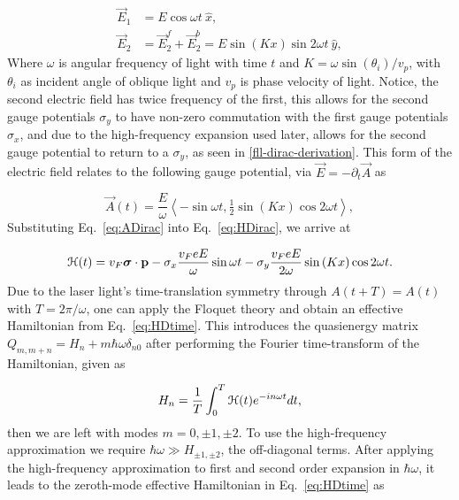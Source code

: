 \begin{align} \label{eq:EDfield}
\vec{E}_{1} &= E\cos \omega t\ \hat{x}, \nonumber \\
\vec{E}_{2} &= \vec{E}_2^f + \vec{E}_2^b = E\sin(Kx)\sin 2\omega t\ \hat{y},
\end{align}
Where $\omega$ is angular frequency of light with time $t$ and $K = \omega \sin{(\theta_i)} / v_p$, with $\theta_i$ as incident angle of oblique light and $v_p$ is phase velocity of light.
Notice, the second electric field has twice frequency of the first, this allows for the second gauge potentials $\sigma_y$ to have non-zero commutation with the first gauge potentials $\sigma_x$, and due to the high-frequency expansion used later, allows for the second gauge potential to return to a $\sigma_y$, as seen in \ref{fll-dirac-derivation}.
This form of the electric field relates to the following gauge potential, via $\vec{E} = -\partial_t \vec{A}$ as

\begin{equation}\label{eq:ADirac}
  \vec{A}(t)= \dfrac{E}{\omega} \left\langle -\sin \omega t, \tfrac{1}{2}\sin(Kx) \cos 2\omega t \right\rangle,
\end{equation}%
Substituting Eq.~\eqref{eq:ADirac} into Eq.~\eqref{eq:HDirac}, we arrive at%

\begin{equation}\label{eq:HDtime}
  \mathcal{H}(t)= v_{F}\bm{\sigma}\cdot\mathbf{p} - \sigma _{x} \dfrac{v_F eE}{\omega} \sin {\omega t} - \sigma _{y} \dfrac{v_F eE}{2\omega}\sin{(Kx)} \cos2\omega t.
\end{equation}%
Due to the laser light's time-translation symmetry through $A(t+T)=A(t)$ with $T=2\pi /\omega $, one can apply the Floquet theory \cite{AEE, MBL, supp} and obtain an effective Hamiltonian from Eq.~\eqref{eq:HDtime}.
This introduces the quasienergy matrix $Q_{m,m+n} = H_n + m\hbar\omega\delta_{n0}$ after performing the Fourier time-transform of the Hamiltonian, given as

\begin{equation} \label{eq:fourier-time-transform}
  H_n = \dfrac{1}{T} \int_{0}^{T} \mathcal{H}(t) e^{-in\omega t} dt,
\end{equation}
then we are left with modes $m=0,\pm1,\pm2$.
To use the high-frequency approximation we require $\hbar\omega \gg H_{\pm1,\pm2}$, the off-diagonal terms.
After applying the high-frequency approximation to first and second order expansion in $\hbar\omega$, it leads to the zeroth-mode effective Hamiltonian in Eq.~\eqref{eq:HDtime} as

